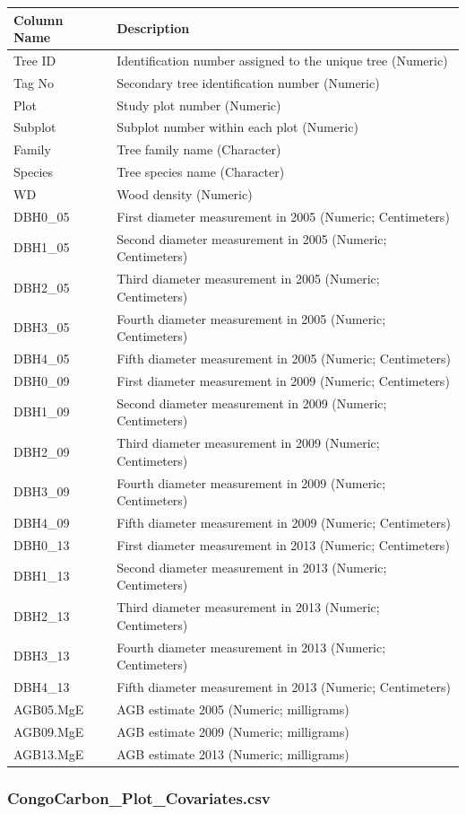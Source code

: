\documentclass[12pt,]{article}
\begin{document}
\begin{longtable}[]{@{}ll@{}}
\toprule
Column Name & Description\tabularnewline
\midrule
\endhead
Tree ID & Identification number assigned to the unique tree
(Numeric)\tabularnewline
Tag No & Secondary tree identification number (Numeric)\tabularnewline
Plot & Study plot number (Numeric)\tabularnewline
Subplot & Subplot number within each plot (Numeric)\tabularnewline
Family & Tree family name (Character)\tabularnewline
Species & Tree species name (Character)\tabularnewline
WD & Wood density (Numeric)\tabularnewline
DBH0\_05 & First diameter measurement in 2005 (Numeric;
Centimeters)\tabularnewline
DBH1\_05 & Second diameter measurement in 2005 (Numeric;
Centimeters)\tabularnewline
DBH2\_05 & Third diameter measurement in 2005 (Numeric;
Centimeters)\tabularnewline
DBH3\_05 & Fourth diameter measurement in 2005 (Numeric;
Centimeters)\tabularnewline
DBH4\_05 & Fifth diameter measurement in 2005 (Numeric;
Centimeters)\tabularnewline
DBH0\_09 & First diameter measurement in 2009 (Numeric;
Centimeters)\tabularnewline
DBH1\_09 & Second diameter measurement in 2009 (Numeric;
Centimeters)\tabularnewline
DBH2\_09 & Third diameter measurement in 2009 (Numeric;
Centimeters)\tabularnewline
DBH3\_09 & Fourth diameter measurement in 2009 (Numeric;
Centimeters)\tabularnewline
DBH4\_09 & Fifth diameter measurement in 2009 (Numeric;
Centimeters)\tabularnewline
DBH0\_13 & First diameter measurement in 2013 (Numeric;
Centimeters)\tabularnewline
DBH1\_13 & Second diameter measurement in 2013 (Numeric;
Centimeters)\tabularnewline
DBH2\_13 & Third diameter measurement in 2013 (Numeric;
Centimeters)\tabularnewline
DBH3\_13 & Fourth diameter measurement in 2013 (Numeric;
Centimeters)\tabularnewline
DBH4\_13 & Fifth diameter measurement in 2013 (Numeric;
Centimeters)\tabularnewline
AGB05.MgE & AGB estimate 2005 (Numeric; milligrams)\tabularnewline
AGB09.MgE & AGB estimate 2009 (Numeric; milligrams)\tabularnewline
AGB13.MgE & AGB estimate 2013 (Numeric; milligrams)\tabularnewline
\bottomrule
\end{longtable}

\hypertarget{congocarbon_plot_covariates.csv}{%
\subsubsection{CongoCarbon\_Plot\_Covariates.csv}\label{congocarbon_plot_covariates.csv}}
\end{document}
